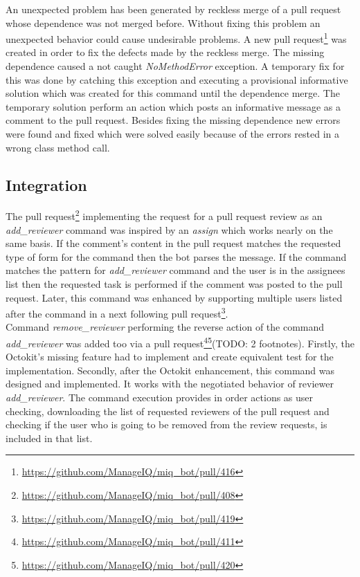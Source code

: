 An unexpected problem has been generated by reckless merge of a pull request whose dependence was not merged before. Without fixing this problem an unexpected behavior could cause undesirable problems. A new pull request\footnote{\url{https://github.com/ManageIQ/miq_bot/pull/416}} was created in order to fix the defects made by the reckless merge. The missing dependence caused a not caught \textit{NoMethodError} exception. A temporary fix for this was done by catching this exception and executing a provisional informative solution which was created for this command until the dependence merge. The temporary solution perform an action which posts an informative message as a comment to the pull request. Besides fixing the missing dependence new errors were found and fixed which were solved easily because of the errors rested in a wrong class method call.

\subsection{Integration}

The pull request\footnote{\url{https://github.com/ManageIQ/miq_bot/pull/408}} implementing the request for a pull request review as an \textit{add\_reviewer} command was inspired by an \textit{assign} which works nearly on the same basis. If the comment's content in the pull request matches the requested type of form for the command then the bot parses the message. If the command matches the pattern for \textit{add\_reviewer} command and the user is in the assignees list then the requested task is performed if the comment was posted to the pull request. Later, this command was enhanced by supporting multiple users listed after the command in a next following pull request\footnote{\url{https://github.com/ManageIQ/miq_bot/pull/419}}.\\

Command \textit{remove\_reviewer} performing the reverse action of the command \textit{add\_reviewer} was added too via a pull request\footnote{\url{https://github.com/ManageIQ/miq_bot/pull/411}}\footnote{\url{https://github.com/ManageIQ/miq_bot/pull/420}}{\color{red}(TODO: 2 footnotes)}. Firstly, the Octokit's missing feature had to implement and create equivalent test for the implementation. Secondly, after the Octokit enhancement, this command was designed and implemented. It works with the negotiated behavior of reviewer \textit{add\_reviewer}. The command execution provides in order actions as user checking, downloading the list of requested reviewers of the pull request and checking if the user who is going to be removed from the review requests, is included in that list.

